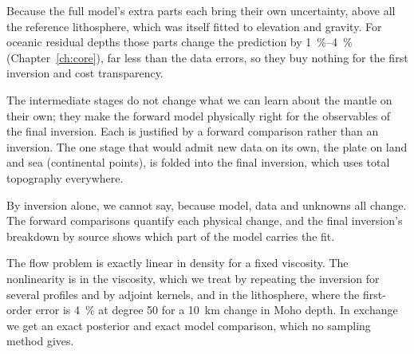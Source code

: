 \begin{defence}
\A Because the full model's extra parts each bring their own uncertainty, above all the reference lithosphere, which was itself fitted to elevation and gravity.
For oceanic residual depths those parts change the prediction by \qtyrange{1}{4}{\percent} (Chapter~\ref{ch:core}), far less than the data errors, so they buy nothing for the first inversion and cost transparency.

\A The intermediate stages do not change what we can learn about the mantle on their own; they make the forward model physically right for the observables of the final inversion.
Each is justified by a forward comparison rather than an inversion.
The one stage that would admit new data on its own, the plate on land and sea (continental points), is folded into the final inversion, which uses total topography everywhere.

\A By inversion alone, we cannot say, because model, data and unknowns all change.
The forward comparisons quantify each physical change, and the final inversion's breakdown by source shows which part of the model carries the fit.

\A The flow problem is exactly linear in density for a fixed viscosity.
The nonlinearity is in the viscosity, which we treat by repeating the inversion for several profiles and by adjoint kernels, and in the lithosphere, where the first-order error is \qty{4}{\percent} at degree 50 for a \qty{10}{km} change in Moho depth.
In exchange we get an exact posterior and exact model comparison, which no sampling method gives.
\end{defence}
